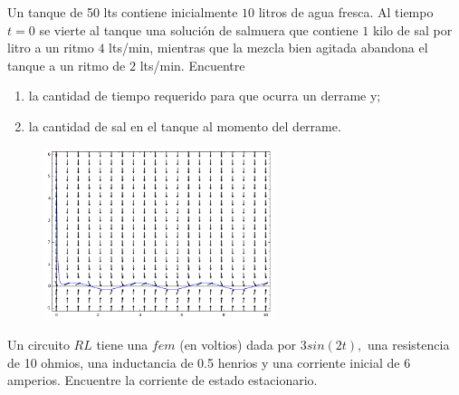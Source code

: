 \begin{problema}
	Un tanque de 50 lts contiene inicialmente $10$ litros de agua fresca. Al tiempo $t=0$ se vierte al tanque una solución de salmuera que contiene $1$ kilo de sal por litro a un ritmo $4$ lts/min, mientras que la mezcla bien agitada abandona el tanque a un ritmo de $2$ lts/min. Encuentre
	\begin{enumerate}
		\item la cantidad de tiempo requerido para que ocurra un derrame y;
		\item la cantidad de sal en el tanque al momento del derrame.
	\end{enumerate}

\end{problema}

\begin{figure}
	\centering
	\includegraphics[height=5cm,keepaspectratio=true]{./edo/img020505.png}
	\label{fig:020505}
\end{figure}

\begin{problema}
	Un circuito $RL$ tiene una $fem$ (en voltios) dada por $3sin(2t),$ una resistencia de 10 ohmios, una inductancia de 0.5 henrios y una corriente inicial de 6 amperios. Encuentre la corriente de estado estacionario.
\end{problema}



